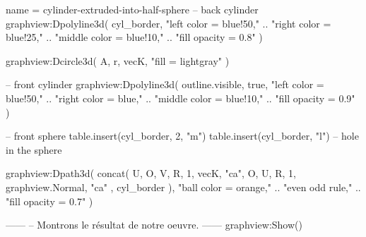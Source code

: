 \documentclass{standalone}
\begin{document}
\begin{luadraw}{name = cylinder-extruded-into-half-sphere}
-- back cylinder
graphview:Dpolyline3d(
  cyl_border,
     "left color = blue!50,"
  .. "right color = blue!25,"
  .. "middle color = blue!10,"
  .. "fill opacity = 0.8"
)

graphview:Dcircle3d(
  A, r, vecK,
  "fill = lightgray"
)

-- front cylinder
graphview:Dpolyline3d(
  outline.visible,
  true,
     "left color = blue!50,"
  .. "right color = blue,"
  .. "middle color = blue!10,"
  .. "fill opacity = 0.9"
)

-- front sphere
table.insert(cyl_border, 2, "m")
table.insert(cyl_border, "l") -- hole in the sphere

graphview:Dpath3d(
  concat(
    {
      U, O, V, R, 1, vecK, "ca",
      O, U, R, 1, graphview.Normal, "ca"
    },
    cyl_border
  ),
     "ball color = orange,"
  .. "even odd rule,"
  .. "fill opacity = 0.7"
)






------
-- Montrons le résultat de notre oeuvre.
------
graphview:Show()
\end{luadraw}
\end{document}
